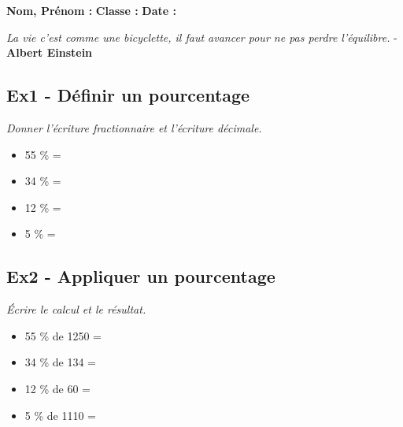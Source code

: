 



\textbf{Nom, Prénom :} \hspace{8cm} \textbf{Classe :} \hspace{3cm} \textbf{Date :}\\

\begin{center}
  \textit{La vie c’est comme une bicyclette, il faut avancer pour ne pas perdre l’équilibre.} - \textbf{Albert Einstein}
\end{center}


\subsection*{Ex1 - Définir un pourcentage}

\textit{Donner l'écriture fractionnaire et l'écriture décimale.}

\begin{multicols}{2}
\begin{itemize}[label={$\bullet$}]
  \item 55 \% = \dotfill \\ \Pointilles[1]
  \item 34 \% = \dotfill \\ \Pointilles[1] \columnbreak 
  \item 12 \% = \dotfill \\ \Pointilles[1]
  \item  5 \% = \dotfill \\ \Pointilles[1]
\end{itemize} 
\end{multicols}

\subsection*{Ex2 - Appliquer un pourcentage}

\textit{Écrire le calcul et le résultat.}

\begin{multicols}{2}
  \begin{itemize}[label={$\bullet$}]
    \item 55 \% de 1250 = \dotfill \\ \Pointilles[1]
    \item 34 \% de 134 = \dotfill \\ \Pointilles[1] \columnbreak 
    \item 12 \% de 60 = \dotfill \\ \Pointilles[1]
    \item  5 \% de 1110 = \dotfill \\ \Pointilles[1]
  \end{itemize} 
  \end{multicols}

